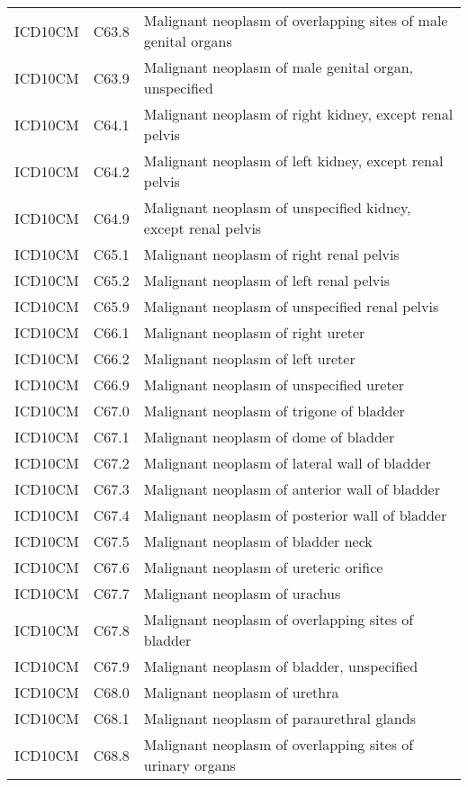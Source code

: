 \begin{table}[ht]
\begin{tabular}{lll}
  ICD10CM & C63.8 & Malignant neoplasm of overlapping sites of male genital organs \\ 
  ICD10CM & C63.9 & Malignant neoplasm of male genital organ, unspecified \\ 
  ICD10CM & C64.1 & Malignant neoplasm of right kidney, except renal pelvis \\ 
  ICD10CM & C64.2 & Malignant neoplasm of left kidney, except renal pelvis \\ 
  ICD10CM & C64.9 & Malignant neoplasm of unspecified kidney, except renal pelvis \\ 
  ICD10CM & C65.1 & Malignant neoplasm of right renal pelvis \\ 
  ICD10CM & C65.2 & Malignant neoplasm of left renal pelvis \\ 
  ICD10CM & C65.9 & Malignant neoplasm of unspecified renal pelvis \\ 
  ICD10CM & C66.1 & Malignant neoplasm of right ureter \\ 
  ICD10CM & C66.2 & Malignant neoplasm of left ureter \\ 
  ICD10CM & C66.9 & Malignant neoplasm of unspecified ureter \\ 
  ICD10CM & C67.0 & Malignant neoplasm of trigone of bladder \\ 
  ICD10CM & C67.1 & Malignant neoplasm of dome of bladder \\ 
  ICD10CM & C67.2 & Malignant neoplasm of lateral wall of bladder \\ 
  ICD10CM & C67.3 & Malignant neoplasm of anterior wall of bladder \\ 
  ICD10CM & C67.4 & Malignant neoplasm of posterior wall of bladder \\ 
  ICD10CM & C67.5 & Malignant neoplasm of bladder neck \\ 
  ICD10CM & C67.6 & Malignant neoplasm of ureteric orifice \\ 
  ICD10CM & C67.7 & Malignant neoplasm of urachus \\ 
  ICD10CM & C67.8 & Malignant neoplasm of overlapping sites of bladder \\ 
  ICD10CM & C67.9 & Malignant neoplasm of bladder, unspecified \\ 
  ICD10CM & C68.0 & Malignant neoplasm of urethra \\ 
  ICD10CM & C68.1 & Malignant neoplasm of paraurethral glands \\ 
  ICD10CM & C68.8 & Malignant neoplasm of overlapping sites of urinary organs \\ 

\end{tabular}
\end{table}

